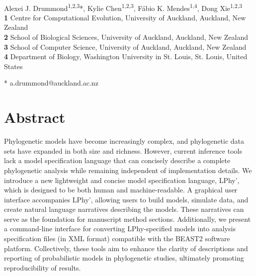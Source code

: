 \documentclass[10pt,letterpaper,table]{article}
\theoremstyle{definition}
\begin{document}
\vspace*{0.2in}

\begin{flushleft}
{\Large
\textbf{} 
}
\newline
\\
Alexei J. Drummond\textsuperscript{1,2,3}*,
Kylie Chen\textsuperscript{1,2,3},
F\'{a}bio K. Mendes\textsuperscript{1,4},
Dong Xie\textsuperscript{1,2,3}
\\
\bigskip
\textbf{1} Centre for Computational Evolution, University of Auckland, Auckland, New Zealand
\\
\textbf{2} School of Biological Sciences, University of Auckland, Auckland, New Zealand
\\
\textbf{3} School of Computer Science, University of Auckland, Auckland, New Zealand
\\
\textbf{4} Department of Biology, Washington University in St. Louis, St. Louis, United States
\\
\bigskip

% 
%

* a.drummond@auckland.ac.nz

\end{flushleft}

\section*{Abstract}
Phylogenetic models have become increasingly complex, and phylogenetic data sets have expanded in both size and richness. 
However, current inference tools lack a model specification language that can concisely describe a complete phylogenetic analysis while remaining independent of implementation details. 
We introduce a new lightweight and concise model specification language, LPhy', which is designed to be both human and machine-readable. 
A graphical user interface accompanies LPhy', allowing users to build models, simulate data, and create natural language narratives describing the models. 
These narratives can serve as the foundation for manuscript method sections. 
Additionally, we present a command-line interface for converting LPhy-specified models into analysis specification files (in XML format) compatible with the BEAST2 software platform. 
Collectively, these tools aim to enhance the clarity of descriptions and reporting of probabilistic models in phylogenetic studies, ultimately promoting reproducibility of results.
\end{document}
